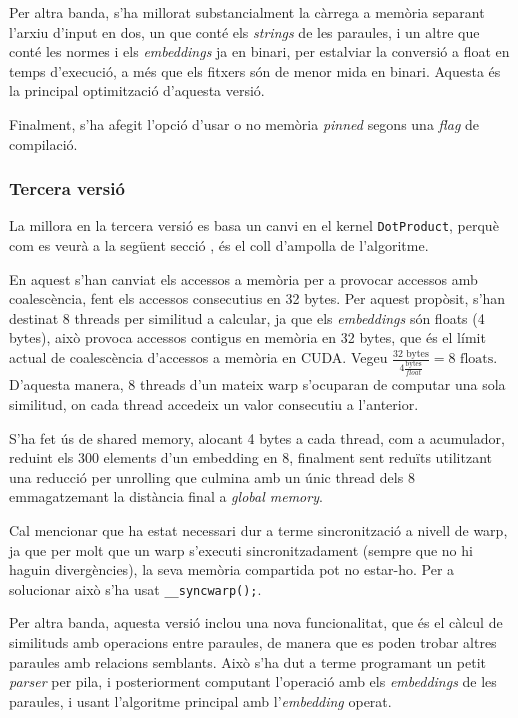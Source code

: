 \documentclass[catalan,10pt,a4paper]{article}
\begin{document}
Per altra banda, s'ha millorat substancialment la càrrega a memòria separant l'arxiu d'input en dos, un que conté els \textit{strings} de les paraules, i un altre que conté les normes i els \textit{embeddings} ja en binari, per estalviar la conversió a float en temps d'execució, a més que els fitxers són de menor mida en binari. Aquesta és la principal optimització d'aquesta versió.

Finalment, s'ha afegit l'opció d'usar o no memòria \textit{pinned} segons una \textit{flag} de compilació.


\subsubsection*{Tercera versió}\label{sec:v3}

La millora en la tercera versió es basa un canvi en el kernel \verb|DotProduct|, perquè com es veurà a la següent secció , és el coll d'ampolla de l'algoritme. 

En aquest s'han canviat els accessos a memòria per a provocar accessos amb coalescència, fent els accessos consecutius en 32 bytes. Per aquest propòsit, s'han destinat 8 threads per similitud a calcular, ja que els \textit{embeddings} són floats (4 bytes), això provoca accessos contigus en memòria en 32 bytes, que és el límit actual de coalescència d'accessos a memòria en CUDA. Vegeu $\frac{32 \text{ bytes}}{4 \frac{\text{bytes}}{float}} = 8 \text{ floats}$. D'aquesta manera, 8 threads d'un mateix warp s'ocuparan de computar una sola similitud, on cada thread accedeix un valor consecutiu a l'anterior.

S'ha fet ús de shared memory, alocant 4 bytes a cada thread, com a acumulador, reduint els 300 elements d'un embedding en 8, finalment sent reduïts utilitzant una reducció per unrolling que culmina amb un únic thread dels 8 emmagatzemant la distància final a \textit{global memory}.

Cal mencionar que ha estat necessari dur a terme sincronització a nivell de warp, ja que per molt que un warp s'executi sincronitzadament (sempre que no hi haguin divergències), la seva memòria compartida pot no estar-ho. Per a solucionar això s'ha usat \verb|__syncwarp();|.

Per altra banda, aquesta versió inclou una nova funcionalitat, que és el càlcul de similituds amb operacions entre paraules, de manera que es poden trobar altres paraules amb relacions semblants. Això s'ha dut a terme programant un petit \textit{parser} per pila, i posteriorment computant l'operació amb els \textit{embeddings} de les paraules, i usant l'algoritme principal amb l'\textit{embedding} operat. 
\end{document}
